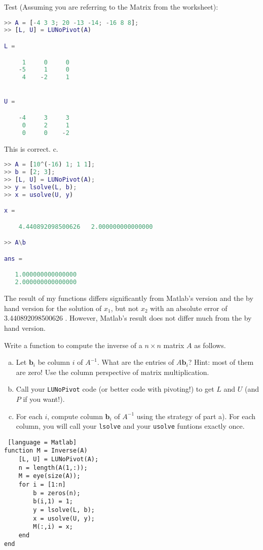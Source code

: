 \documentclass[12pt]{article}
\makeatletter
\theoremstyle{homework}
\newenvironment{exercise}[1]
{\def\@currentlabel{#1}\exercisecore}
{\endexercisecore}
\makeatother
\begin{document}
Test (Assuming you are referring to the Matrix from the worksheet):
\begin{lstlisting}[language=Matlab]
>> A = [-4 3 3; 20 -13 -14; -16 8 8];
>> [L, U] = LUNoPivot(A)

L =

	 1     0     0
	-5     1     0
	 4    -2     1


U =

	-4     3     3
	 0     2     1
	 0     0    -2
\end{lstlisting}
This is correct. c.
\begin{lstlisting}[language=Matlab]
>> A = [10^(-16) 1; 1 1];
>> b = [2; 3];
>> [L, U] = LUNoPivot(A);
>> y = lsolve(L, b);
>> x = usolve(U, y)

x =

	4.440892098500626   2.000000000000000

>> A\b

ans =

   1.000000000000000
   2.000000000000000
\end{lstlisting}
The result of my functions differs significantly from Matlab's version and the by hand
version for the solution of $x_1$, but not $x_2$ with an absolute error of 3.440892098500626
. However, Matlab's result does not differ much from the by hand version.


\begin{exercise}{Supplemental 1}
Write a function to compute the inverse of a $n\times n$ matrix $A$ as follows.
\begin{enumerate}[(a)]
	\item Let $\mathbf{b}_i$ be column $i$ of $A^{-1}$.  What
	are the entries of  $A \mathbf{b}_i$?  Hint: most of them are zero!
	Use the column perspective of matrix multiplication.
	\item Call your {\tt LUNoPivot} code (or better code with pivoting!)
	to get $L$ and $U$ (and $P$ if you want!).
	\item For each $i$, compute column $\mathbf{b}_i$ of $A^{-1}$
	using the strategy of part a).  For each column, you will call your {\tt lsolve} and your {\tt usolve} funtions exactly once.
\end{enumerate}
\end{exercise}
\begin{lstlisting} [language = Matlab]
function M = Inverse(A)
    [L, U] = LUNoPivot(A);
    n = length(A(1,:));
    M = eye(size(A));
    for i = [1:n]
        b = zeros(n);
        b(i,1) = 1;
        y = lsolve(L, b);
        x = usolve(U, y);
        M(:,i) = x;
    end
end
\end{lstlisting}
\end{document}
